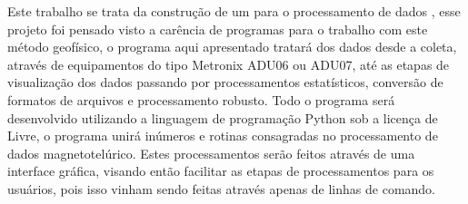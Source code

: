     Este trabalho se trata da construção de um  para o processamento de dados \MT, esse projeto foi pensado visto a carência de programas para o trabalho com este método geofísico, o programa aqui apresentado tratará dos dados desde a coleta, através de equipamentos do tipo Metronix ADU06 ou ADU07, até as etapas de visualização dos dados passando por processamentos estatísticos, conversão de formatos de arquivos e processamento robusto.
    Todo o programa será desenvolvido utilizando a linguagem de programação Python sob a licença de  Livre, o programa unirá inúmeros  e rotinas consagradas no processamento de dados magnetotelúrico. Estes processamentos serão feitos através de uma interface gráfica, visando então facilitar as etapas de processamentos para os usuários, pois isso vinham sendo feitas através apenas de linhas de comando.%
